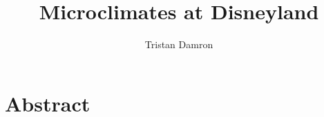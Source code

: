\documentclass[11pt]{article}
\title{\textbf{Microclimates at Disneyland}}
\author{Tristan Damron}
\date{}
\begin{document}
\maketitle

\section{Abstract}
\end{document}
